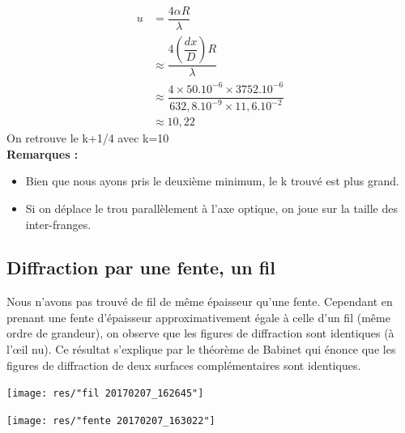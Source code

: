 \documentclass[12pt,a4paper]{article}
\begin{document}
	\bgroup
	\addtolength{\jot}{4pt}
	\begin{align*}
	u&=\dfrac{4\alpha R}{\lambda}\\
	&\approx\dfrac{4 \left(\dfrac{dx}{D}\right) R }{\lambda}\\
	&\approx\dfrac{4\times50.10^{-6}\times3752.10^{-6}}{632,8.10^{-9}\times11,6.10^{-2}}\\
	&\approx10,22
	\end{align*}
	\egroup
	On retrouve le k+1/4 avec k=10\\
	\textbf{Remarques :}
	\begin{itemize}
		\item  Bien que nous ayons pris le deuxième minimum, le k trouvé est plus grand.
		\item  Si on déplace le trou parallèlement à l'axe optique, on joue sur la taille des inter-franges. 
	\end{itemize}
	\subsection{Diffraction par une fente, un fil}
	Nous n'avons pas trouvé de fil de même épaisseur qu'une fente. Cependant en prenant une fente d'épaisseur approximativement égale à celle d'un fil (même ordre de grandeur), on observe que les figures de diffraction sont identiques (à l'œil nu).
	Ce résultat s'explique par le théorème de Babinet qui énonce que les figures de diffraction de deux surfaces complémentaires sont identiques.\\
	\begin{bigcenter}
		\begin{multicols}{2}
			\bgroup
			\texttt{[image: res/"fil 20170207\_162645"]}
			\egroup
			
			\columnbreak
			\vfill
			\bgroup
			\texttt{[image: res/"fente 20170207\_163022"]}
			\egroup
		\end{multicols}
	\end{bigcenter}
	
\end{document}
